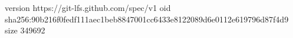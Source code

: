 version https://git-lfs.github.com/spec/v1
oid sha256:90b216f0fedf111aec1beb8847001cc6433e8122089d6e0112e619796d87f4d9
size 349692
